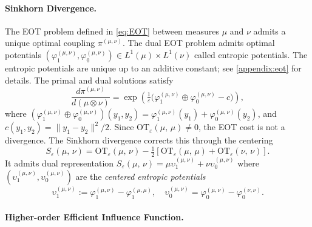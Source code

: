\documentclass{article}
\theoremstyle{plain}
\theoremstyle{definition}
\theoremstyle{remark}
\newcommand{\of}[1]{\left(#1\right)}
\newcommand{\1}{\mathbbm{1}}
\newcommand{\SinkDiv}[2]{{S}_\eps\of{#1,\, #2}}
\newcommand{\EntOT}[2]{\text{OT}_\eps\of{#1,\, #2}}
\newcommand{\eps}{\varepsilon}
\theoremstyle{plain}
\theoremstyle{definition}
\begin{document}
\paragraph{Sinkhorn Divergence.} 

The EOT problem defined in \eqref{eq:EOT} between measures $\mu$ and $\nu$ admits a unique optimal coupling $\pi^{(\mu,\nu)}$. The dual EOT problem admits optimal potentials $(\varphi_1^{(\mu,\nu)},\varphi_0^{(\mu,\nu)})\in L^1(\mu)\times L^1(\nu)$ called entropic potentials. The entropic potentials are unique up to an additive constant; see \cref{appendix:eot} for details. The primal and dual solutions satisfy
\begin{equation}\label{eq:primal_dual_EOT_relationship}
    \frac{d\pi^{(\mu,\nu)}}{d(\mu \otimes \nu)} =\exp\of{\tfrac{1}{\eps}\big(\varphi_1^{(\mu,\nu)} \oplus \varphi_0^{(\mu,\nu)} - c \big)},
\end{equation}
where $(\varphi_1^{(\mu,\nu)} \oplus \varphi_0^{(\mu,\nu)})(y_1, y_2) = \varphi_1^{(\mu,\nu)}(y_1) + \varphi_0^{(\mu,\nu)}(y_2)$, and $c(y_1, y_2) = \|y_1-y_2\|^2/2$. Since $\EntOT{\mu}{\mu}\neq0$, the EOT cost is not a divergence. The Sinkhorn divergence \citep{ramdas2015wasserstein,feydy2019interpolating} corrects this through the centering
\begin{equation}\label{eq:sinkhorn_div}
\SinkDiv{\mu}{\nu}
=
\EntOT{\mu}{\nu}
-\tfrac12[\EntOT{\mu}{\mu}
+\EntOT{\nu}{\nu}].
\end{equation}
It admits dual representation $\SinkDiv{\mu}{\nu} = \mu \upsilon_1^{(\mu,\nu)} +\nu \upsilon_0^{(\mu,\nu)}$ where $(\upsilon_1^{(\mu,\nu)}, \upsilon_0^{(\mu,\nu)})$ are the \textit{centered entropic potentials}
\[
\upsilon_1^{(\mu,\nu)} := \varphi_1^{(\mu,\nu)}-\varphi_1^{(\mu,\mu)}, \quad \upsilon_0^{(\mu,\nu)} = \varphi_0^{(\mu,\nu)}-\varphi_0^{(\nu,\nu)}.
\]

\paragraph{Higher-order Efficient Influence Function.}
\end{document}
